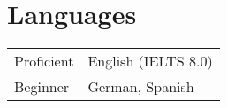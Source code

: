 \documentclass[12pt, a4paper]{extarticle}
\begin{document}
\section*{Languages}

\begin{tabular}{ @{\hskip 0pt} p{} | p{} }
    Proficient & English (IELTS 8.0) \\
    Beginner & German, Spanish \\
\end{tabular}
\end{document}
